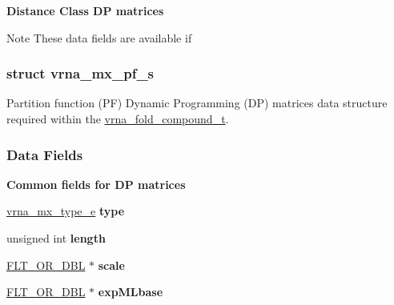 \begin{Indent}\textbf{ Distance Class DP matrices}\par
{\em \begin{DoxyNote}{Note}
These data fields are available if 
\begin{DoxyCode}{0}
\end{DoxyCode}
 
\end{DoxyNote}
}\end{Indent}
\label{structvrna__mx__pf__s}
\subsubsection{struct vrna\+\_\+mx\+\_\+pf\+\_\+s}
Partition function (PF) Dynamic Programming (DP) matrices data structure required within the \mbox{\hyperlink{group__fold__compound_ga1b0cef17fd40466cef5968eaeeff6166}{vrna\+\_\+fold\+\_\+compound\+\_\+t}}. \subsubsection*{Data Fields}
\begin{Indent}\textbf{ Common fields for DP matrices}\par
\begin{DoxyCompactItemize}
\item 
\mbox{\label{group__dp__matrices_a74ba745d6fc4ac5d437bc24450ea789c}} 
\mbox{\hyperlink{group__dp__matrices_ga6042ea1d58d01931e959791be6d89343}{vrna\+\_\+mx\+\_\+type\+\_\+e}} {\bfseries type}
\item 
\mbox{\label{group__dp__matrices_a798f72ece3f3f970bb0de2120600ad63}} 
unsigned int {\bfseries length}
\item 
\mbox{\label{group__dp__matrices_a133ac57938cb0969da254a594572baf8}} 
\mbox{\hyperlink{group__data__structures_ga31125aeace516926bf7f251f759b6126}{F\+L\+T\+\_\+\+O\+R\+\_\+\+D\+BL}} $\ast$ {\bfseries scale}
\item 
\mbox{\label{group__dp__matrices_ae18e83833416f62943d5dd7be1cc038f}} 
\mbox{\hyperlink{group__data__structures_ga31125aeace516926bf7f251f759b6126}{F\+L\+T\+\_\+\+O\+R\+\_\+\+D\+BL}} $\ast$ {\bfseries exp\+M\+Lbase}
\end{DoxyCompactItemize}
\end{Indent}
